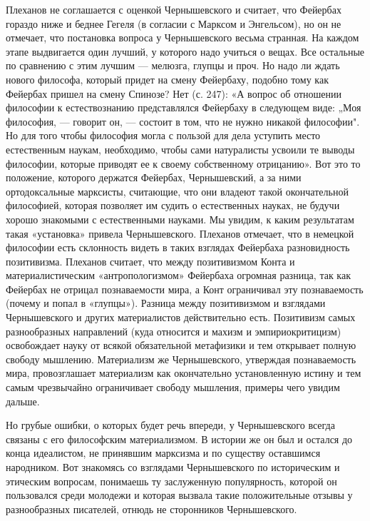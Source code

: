 Плеханов не соглашается с оценкой Чернышевского и считает, что Фейербах гораздо
ниже и беднее Гегеля (в согласии с Марксом и Энгельсом), но он не отмечает, что
постановка вопроса у Чернышевского весьма странная. На каждом этапе выдвигается
один лучший, у которого надо учиться о вещах. Все остальные по сравнению с этим
лучшим --- мелюзга, глупцы и проч. Но надо ли ждать нового философа, который
придет на смену Фейербаху, подобно тому как Фейербах пришел на смену Спинозе?
Нет (с. 247): «А вопрос об отношении философии к естествознанию представлялся
Фейербаху в следующем виде: „Моя философия, --- говорит он, --- состоит в том, что
не нужно никакой философии". Но для того чтобы философия могла с пользой для
дела уступить место естественным наукам, необходимо, чтобы сами натуралисты
усвоили те выводы философии, которые приводят ее к своему собственному
отрицанию». Вот это то положение, которого держатся Фейербах, Чернышевский, а
за ними ортодоксальные марксисты, считающие, что они владеют такой
окончательной философией, которая позволяет им судить о естественных науках, не
будучи хорошо знакомыми с естественными науками. Мы увидим, к каким результатам
такая «установка» привела Чернышевского. Плеханов отмечает, что в немецкой
философии есть склонность видеть в таких взглядах Фейербаха разновидность
позитивизма. Плеханов считает, что между позитивизмом Конта и
материалистическим «антропологизмом» Фейербаха огромная разница, так как
Фейербах не отрицал познаваемости мира, а Конт ограничивал эту познаваемость
(почему и попал в «глупцы»). Разница между позитивизмом и взглядами
Чернышевского и других материалистов действительно есть. Позитивизм самых
разнообразных направлений (куда относится и махизм и эмпириокритицизм)
освобождает науку от всякой обязательной метафизики и тем открывает полную
свободу мышлению. Материализм же Чернышевского, утверждая познаваемость мира,
провозглашает материализм как окончательно установленную истину и тем самым
чрезвычайно ограничивает свободу мышления, примеры чего увидим дальше.

Но грубые ошибки, о которых будет речь впереди, у Чернышевского всегда связаны
с его философским материализмом. В истории же он был и остался до конца
идеалистом, не принявшим марксизма и по существу оставшимся народником. Вот
знакомясь со взглядами Чернышевского по историческим и этическим вопросам,
понимаешь ту заслуженную популярность, которой он пользовался среди молодежи и
которая вызвала такие положительные отзывы у разнообразных писателей, отнюдь не
сторонников Чернышевского.

